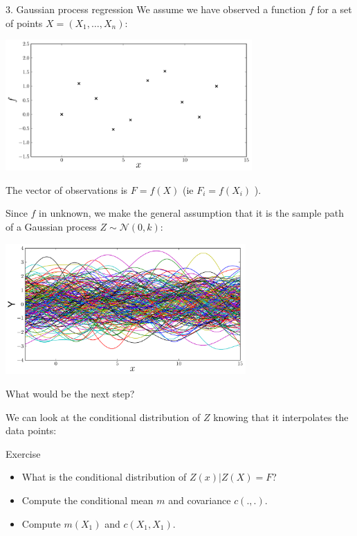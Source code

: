 \begin{frame}{3. Gaussian process regression}
We assume we have observed a function $f$ for a set of points $X = (X_1,\dots,X_n)$:
\begin{center}
\includegraphics[height=5cm]{1_stat_models/figures/R/Fig1-data}
\end{center}
The vector of observations is $F=f(X)$ (ie $F_i = f(X_i)$ ).
\end{frame}

\begin{frame}{}
Since $f$ in unknown, we make the general assumption that
it is the sample path of a Gaussian process $Z \sim \mathcal{N}(0,k)$:
\begin{center}
\includegraphics[height=5cm]{1_stat_models/figures/R/Fig1b-sim}
\end{center}
What would be the next step?
\end{frame}

\begin{frame}{}
We can look at the conditional distribution of $Z$ knowing that it interpolates the data points:
\begin{exampleblock}{Exercise}
\begin{itemize}
	\item[1.] What is the conditional distribution of $Z(x)|Z(X)=F$?
	\item[2.] Compute the conditional mean $m$ and covariance $c(.,.)$.
	\item[3.] Compute $m(X_1)$ and $c(X_1,X_1)$.
\end{itemize}
\end{exampleblock}
\end{frame}

